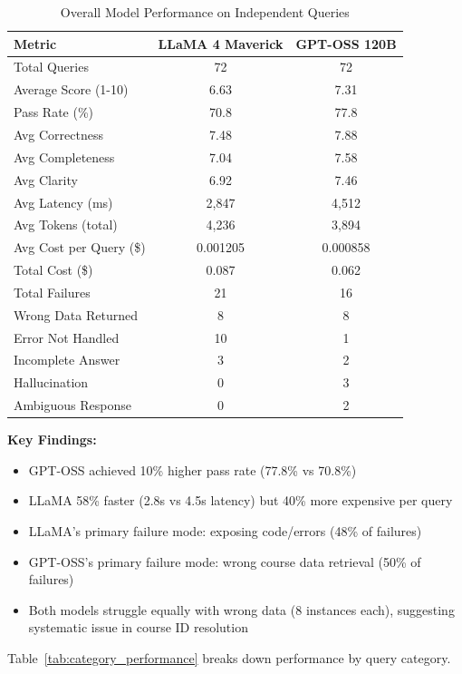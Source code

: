 \documentclass{article}
\begin{document}
\begin{table}[h]
\centering
\caption{Overall Model Performance on Independent Queries}
\label{tab:overall_performance}
\begin{tabular}{lcc}
\toprule
\textbf{Metric} & \textbf{LLaMA 4 Maverick} & \textbf{GPT-OSS 120B} \\
\midrule
Total Queries & 72 & 72 \\
Average Score (1-10) & 6.63 & 7.31 \\
Pass Rate (\%) & 70.8 & 77.8 \\
Avg Correctness & 7.48 & 7.88 \\
Avg Completeness & 7.04 & 7.58 \\
Avg Clarity & 6.92 & 7.46 \\
\midrule
Avg Latency (ms) & 2,847 & 4,512 \\
Avg Tokens (total) & 4,236 & 3,894 \\
Avg Cost per Query (\$) & 0.001205 & 0.000858 \\
Total Cost (\$) & 0.087 & 0.062 \\
\midrule
Total Failures & 21 & 16 \\
Wrong Data Returned & 8 & 8 \\
Error Not Handled & 10 & 1 \\
Incomplete Answer & 3 & 2 \\
Hallucination & 0 & 3 \\
Ambiguous Response & 0 & 2 \\
\bottomrule
\end{tabular}
\end{table}

\textbf{Key Findings:}
\begin{itemize}
    \item GPT-OSS achieved 10\% higher pass rate (77.8\% vs 70.8\%)
    \item LLaMA 58\% faster (2.8s vs 4.5s latency) but 40\% more expensive per query
    \item LLaMA's primary failure mode: exposing code/errors (48\% of failures)
    \item GPT-OSS's primary failure mode: wrong course data retrieval (50\% of failures)
    \item Both models struggle equally with wrong data (8 instances each), suggesting systematic issue in course ID resolution
\end{itemize}

Table~\ref{tab:category_performance} breaks down performance by query category.
\end{document}
